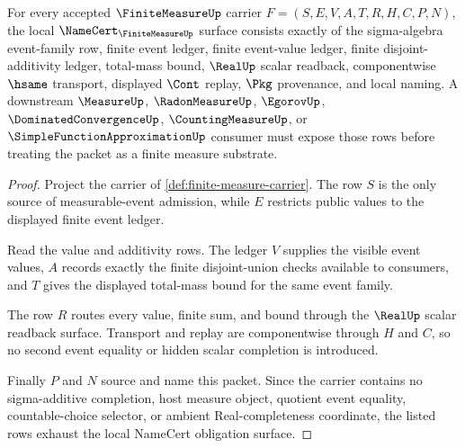 \begin{theorem}
\label{thm:finite-measure-namecert-obligations}
For every accepted $\FiniteMeasureUp$ carrier $F=(S,E,V,A,T,R,H,C,P,N)$, the local $\NameCert_{\FiniteMeasureUp}$ surface consists exactly of the sigma-algebra event-family row, finite event ledger, finite event-value ledger, finite disjoint-additivity ledger, total-mass bound, $\RealUp$ scalar readback, componentwise $\hsame$ transport, displayed $\Cont$ replay, $\Pkg$ provenance, and local naming. A downstream $\MeasureUp$, $\RadonMeasureUp$, $\EgorovUp$, $\DominatedConvergenceUp$, $\CountingMeasureUp$, or $\SimpleFunctionApproximationUp$ consumer must expose those rows before treating the packet as a finite measure substrate.
\end{theorem}
\begin{proof}
Project the carrier of \autoref{def:finite-measure-carrier}. The row $S$ is the only source of measurable-event admission, while $E$ restricts public values to the displayed finite event ledger.

Read the value and additivity rows. The ledger $V$ supplies the visible event values, $A$ records exactly the finite disjoint-union checks available to consumers, and $T$ gives the displayed total-mass bound for the same event family.

The row $R$ routes every value, finite sum, and bound through the $\RealUp$ scalar readback surface. Transport and replay are componentwise through $H$ and $C$, so no second event equality or hidden scalar completion is introduced.

Finally $P$ and $N$ source and name this packet. Since the carrier contains no sigma-additive completion, host measure object, quotient event equality, countable-choice selector, or ambient Real-completeness coordinate, the listed rows exhaust the local NameCert obligation surface.
\end{proof}

